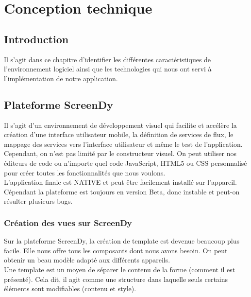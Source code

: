 \documentclass[12pt,a4paper]{report}
\begin{document}
		















		\chapter{Conception technique}
		

		\section{Introduction}
Il s’agit dans ce chapitre d’identifier les différentes caractéristiques de l’environnement logiciel ainsi que les technologies qui nous ont servi à l’implémentation de notre application.		
		
		
		\section{Plateforme ScreenDy}
Il s'agit d'un environnement de développement visuel qui facilite et accélère la création d'une interface utilisateur mobile, la définition de services de flux, le mappage des services vers l'interface utilisateur et même le test de l'application. Cependant, on n'est pas limité par le constructeur visuel. On peut utiliser nos éditeurs de code ou n'importe quel code JavaScript, HTML5 ou CSS personnalisé pour créer toutes les fonctionnalités que nous voulons.\\
L'application finale est NATIVE et peut être facilement installé sur l'appareil.\\
Cépendant la plateforme est toujours en version Beta, donc instable et peut-on résulter plusieurs bugs.

		\subsection{Création des vues sur ScreenDy}
Sur la plateforme ScreenDy, la création de template est devenue beaucoup plus facile. Elle nous offre tous les composants dont nous avons besoin. On peut obtenir un beau modèle adapté aux différents appareils.\\
Une template est un moyen de séparer le contenu de la forme (comment il est présenté). Cela dit, il agit comme une structure dans laquelle seuls certains éléments sont modifiables (contenu et style).
		
\end{document}
